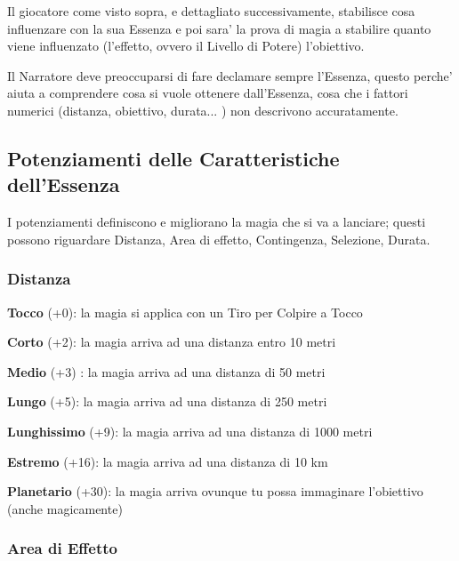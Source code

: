 \documentclass[a4paper,11pt,twoside,openany]{book}
\begin{document}
	Il giocatore come visto sopra, e dettagliato successivamente, stabilisce cosa influenzare con la sua Essenza e poi sara' la prova di magia a stabilire quanto viene influenzato (l'effetto, ovvero il Livello di Potere) l'obiettivo.
	
	Il Narratore deve preoccuparsi di fare declamare sempre l'Essenza, questo perche' aiuta a comprendere cosa si vuole ottenere dall'Essenza, cosa che i fattori numerici (distanza, obiettivo, durata... ) non descrivono accuratamente.
	
	\subsection{Potenziamenti delle Caratteristiche dell'Essenza}
	
	\label{potenziamenti-delle-caratteristiche-dellessenza}
	
	I potenziamenti definiscono e migliorano la magia che si va a lanciare; questi possono riguardare Distanza, Area di effetto, Contingenza, Selezione, Durata.
	
	\subsubsection{Distanza}
	
	\label{distanza}
	
	\textbf{Tocco} (+0): la magia si applica con un Tiro per Colpire a
	Tocco
	
	\textbf{Corto} (+2): la magia arriva ad una distanza entro 10 metri
	
	\textbf{Medio} (+3) : la magia arriva ad una distanza di 50 metri
	
	\textbf{Lungo} (+5): la magia arriva ad una distanza di 250 metri
	
	\textbf{Lunghissimo} (+9): la magia arriva ad una distanza di 1000 metri
	
	\textbf{Estremo} (+16): la magia arriva ad una distanza di 10 km
	
	\textbf{Planetario} (+30): la magia arriva ovunque tu possa immaginare l'obiettivo (anche magicamente)
	
	\subsubsection{Area di Effetto}
	
	\label{area-di-effetto}
	
\end{document}
